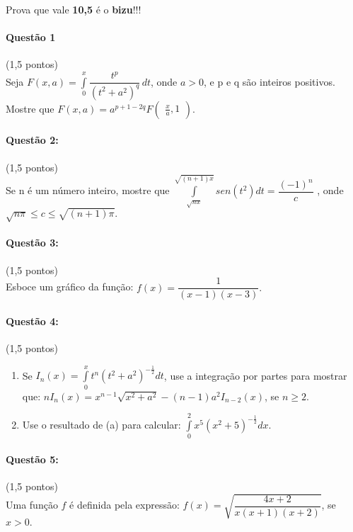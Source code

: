 \documentclass[12pt,a4paper]{article}
\begin{document}
Prova que vale \textbf{10,5} é o \textbf{bizu}!!!

\paragraph{Questão 1}(1,5 pontos)\\
Seja $F(x,a)=\displaystyle\int\limits_{0}^{x}\dfrac{t^p}{(t^2+a^2)^q}\,dt$, onde $a>0$, e
 p e q são inteiros positivos. Mostre que $F(x,a)=a^{p+1-2q}F\begin{pmatrix}
\frac{x}{a},1
\end{pmatrix}.$


\paragraph{Questão 2:}(1,5 pontos)\\
Se n é um número inteiro, mostre que $\displaystyle\int\limits_{\sqrt{nx}}^{\sqrt{(n+1)x}}sen(t^2)dt=\dfrac{(-1)^n}{c}$
, onde $\sqrt{n\pi }\leq c\leq \sqrt{(n+1) \pi}.$


\paragraph{Questão 3:}(1,5 pontos)\\
Esboce um gráfico da função: $f(x)=\dfrac{1}{(x-1)(x-3)}.$


\paragraph{Questão 4:}(1,5 pontos)\\

\begin{enumerate}[label=(\alph*)]
\item Se $I_{n}(x)=\displaystyle\int\limits_{0}^{x}t^n(t^2+a^2)^{-\frac{1}{2}}dt$, use a integração por partes para mostrar 
que: $nI_{n}(x)=x^{n-1}\sqrt{x^2+a^2}-(n-1)a^2I_{n-2}(x)$, se $n\geq 2.$
\item Use o resultado de (a) para calcular: $\displaystyle\int\limits_{0}^{2}x^5(x^2+5)^{-\frac{1}{2}}dx.$
\end{enumerate}


\paragraph{Questão 5:}(1,5 pontos)\\
Uma função $f$ é definida pela expressão: $f(x)=\sqrt{\dfrac{4x+2}{x(x+1)(x+2)}}$, se $x>0.$
\end{document}
